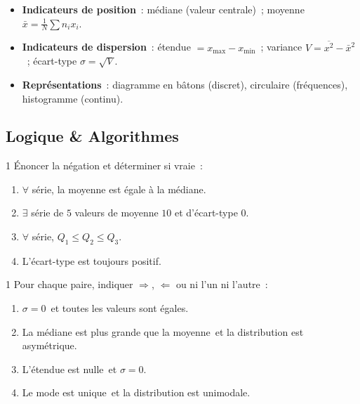 \begin{bilan}
\begin{itemize}
  \item \textbf{Indicateurs de position}~:
        m\'ediane (valeur centrale)~;
        moyenne $\bar{x}=\frac{1}{N}\sum n_i x_i$.
  \item \textbf{Indicateurs de dispersion}~:
        \'etendue $= x_{\max}-x_{\min}$~;
        variance $V=\overline{x^2}-\bar{x}^2$~;
        \'ecart-type $\sigma=\sqrt{V}$.
  \item \textbf{Repr\'esentations}~: diagramme en b\^atons (discret),
        circulaire (fr\'equences), histogramme (continu).
\end{itemize}

\subsection*{Logique \& Algorithmes}

\begin{exo}{1}
\'Enoncer la n\'egation et d\'eterminer si vraie~:
\begin{enumerate}
  \item $\forall$ s\'erie, la moyenne est \'egale \`a la m\'ediane.
  \item $\exists$ s\'erie de $5$ valeurs de moyenne $10$ et d'\'ecart-type $0$.
  \item $\forall$ s\'erie, $Q_1\leq Q_2\leq Q_3$.
  \item L'\'ecart-type est toujours positif.
\end{enumerate}
\end{exo}

\begin{exo}{1}
Pour chaque paire, indiquer $\Rightarrow$, $\Leftarrow$ ou ni l'un ni l'autre~:
\begin{enumerate}
  \item \og $\sigma=0$\fg\ et \og toutes les valeurs sont \'egales\fg.
  \item \og La m\'ediane est plus grande que la moyenne\fg\ et
        \og la distribution est asym\'etrique\fg.
  \item \og L'\'etendue est nulle\fg\ et \og $\sigma=0$\fg.
  \item \og Le mode est unique\fg\ et \og la distribution est unimodale\fg.
\end{enumerate}
\end{exo}


\end{bilan}
